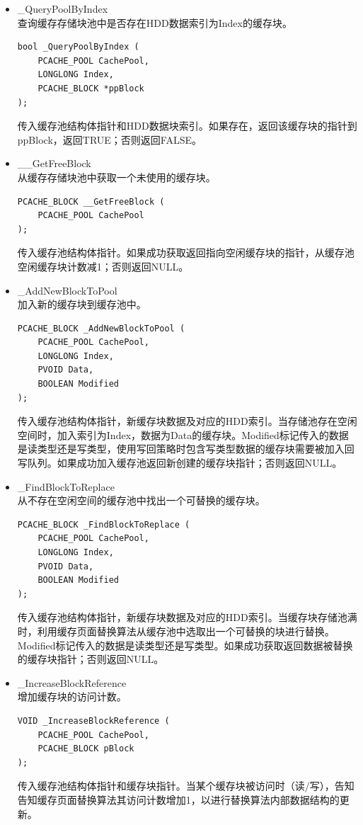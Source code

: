 \begin{itemize}

\item \_QueryPoolByIndex
\\查询缓存存储块池中是否存在HDD数据索引为Index的缓存块。
\begin{lstlisting}
bool _QueryPoolByIndex (
    PCACHE_POOL CachePool,
    LONGLONG Index,
    PCACHE_BLOCK *ppBlock
);
\end{lstlisting}
传入缓存池结构体指针和HDD数据块索引。如果存在，返回该缓存块的指针到ppBlock，返回TRUE；否则返回FALSE。

\item \_\_GetFreeBlock
\\从缓存存储块池中获取一个未使用的缓存块。
\begin{lstlisting}
PCACHE_BLOCK __GetFreeBlock (
    PCACHE_POOL CachePool
);
\end{lstlisting}
传入缓存池结构体指针。如果成功获取返回指向空闲缓存块的指针，从缓存池空闲缓存块计数减1；否则返回NULL。

\item \_AddNewBlockToPool
\\加入新的缓存块到缓存池中。
\begin{lstlisting}
PCACHE_BLOCK _AddNewBlockToPool (
    PCACHE_POOL CachePool,
    LONGLONG Index,
    PVOID Data,
    BOOLEAN Modified
);
\end{lstlisting}
传入缓存池结构体指针，新缓存块数据及对应的HDD索引。当存储池存在空闲空间时，加入索引为Index，数据为Data的缓存块。Modified标记传入的数据是读类型还是写类型，使用写回策略时包含写类型数据的缓存块需要被加入回写队列。如果成功加入缓存池返回新创建的缓存块指针；否则返回NULL。

\item \_FindBlockToReplace
\\从不存在空闲空间的缓存池中找出一个可替换的缓存块。
\begin{lstlisting}
PCACHE_BLOCK _FindBlockToReplace (
    PCACHE_POOL CachePool,
    LONGLONG Index,
    PVOID Data,
    BOOLEAN Modified
);
\end{lstlisting}
传入缓存池结构体指针，新缓存块数据及对应的HDD索引。当缓存块存储池满时，利用缓存页面替换算法从缓存池中选取出一个可替换的块进行替换。Modified标记传入的数据是读类型还是写类型。如果成功获取返回数据被替换的缓存块指针；否则返回NULL。

\item \_IncreaseBlockReference
\\增加缓存块的访问计数。
\begin{lstlisting}
VOID _IncreaseBlockReference (
    PCACHE_POOL CachePool,
    PCACHE_BLOCK pBlock
);
\end{lstlisting}
传入缓存池结构体指针和缓存块指针。当某个缓存块被访问时（读/写），告知告知缓存页面替换算法其访问计数增加1，以进行替换算法内部数据结构的更新。

\end{itemize}

